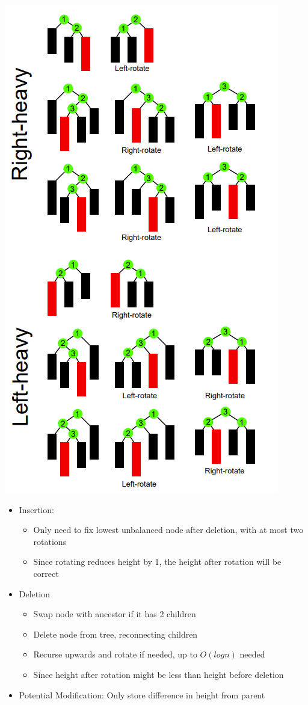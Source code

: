 \documentclass[10pt, landscape]{article}
\begin{document}
\begin{multicols*}{4}
\begin{center}
    \includegraphics[width=0.7\linewidth]{rotation.png}    
\end{center}
\begin{itemize}
    \item Insertion:
    \begin{itemize}
        \item Only need to fix lowest unbalanced node after deletion, with at most two rotations
        \item Since rotating reduces height by 1, the height after rotation will be correct
    \end{itemize}
    \item Deletion
    \begin{itemize}
        \item Swap node with ancestor if it has 2 children
        \item Delete node from tree, reconnecting children
        \item Recurse upwards and rotate if needed, up to $O(logn)$ needed
        \item Since height after rotation might be less than height before deletion
    \end{itemize}
    \item Potential Modification: Only store difference in height from parent
\end{itemize}


\end{multicols*}
\end{document}
